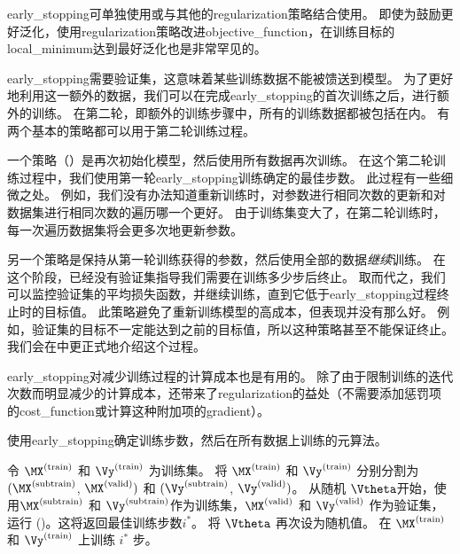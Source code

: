 \gls{early_stopping}可单独使用或与其他的\gls{regularization}策略结合使用。
即使为鼓励更好泛化，使用\gls{regularization}策略改进\gls{objective_function}，在训练目标的\gls{local_minimum}达到最好泛化也是非常罕见的。

\gls{early_stopping}需要验证集，这意味着某些训练数据不能被馈送到模型。
为了更好地利用这一额外的数据，我们可以在完成\gls{early_stopping}的首次训练之后，进行额外的训练。
在第二轮，即额外的训练步骤中，所有的训练数据都被包括在内。
有两个基本的策略都可以用于第二轮训练过程。


一个策略（）是再次初始化模型，然后使用所有数据再次训练。
在这个第二轮训练过程中，我们使用第一轮\gls{early_stopping}训练确定的最佳步数。
此过程有一些细微之处。
例如，我们没有办法知道重新训练时，对参数进行相同次数的更新和对数据集进行相同次数的遍历哪一个更好。
由于训练集变大了，在第二轮训练时，每一次遍历数据集将会更多次地更新参数。

另一个策略是保持从第一轮训练获得的参数，然后使用全部的数据\emph{继续}训练。
在这个阶段，已经没有验证集指导我们需要在训练多少步后终止。
取而代之，我们可以监控验证集的平均损失函数，并继续训练，直到它低于\gls{early_stopping}过程终止时的目标值。
此策略避免了重新训练模型的高成本，但表现并没有那么好。
例如，验证集的目标不一定能达到之前的目标值，所以这种策略甚至不能保证终止。
我们会在中更正式地介绍这个过程。

\gls{early_stopping}对减少训练过程的计算成本也是有用的。
除了由于限制训练的迭代次数而明显减少的计算成本，还带来了\gls{regularization}的益处（不需要添加惩罚项的\gls{cost_function}或计算这种附加项的\gls{gradient}）。

\begin{algorithm}[ht]
\caption{使用\gls{early_stopping}确定训练步数，然后在所有数据上训练的元算法。
}
\label{alg:early_stopping_retrain}
\begin{algorithmic}
\STATE 令 $\MX^{(\text{train})}$ 和 $\Vy^{(\text{train})}$ 为训练集。
\STATE 将 $\MX^{(\text{train})}$ 和 $\Vy^{(\text{train})}$ 分别分割为 $(\MX^{(\text{subtrain})}$, $\MX^{(\text{valid})})$ 和 $(\Vy^{(\text{subtrain})}$, $\Vy^{(\text{valid})})$。
\STATE 从随机 $\Vtheta$开始，使用$\MX^{(\text{subtrain})}$ 和 $\Vy^{(\text{subtrain})}$作为训练集，$\MX^{(\text{valid})}$ 和 $\Vy^{(\text{valid})}$ 作为验证集，运行 ()。这将返回最佳训练步数$i^*$。
\STATE 将 $\Vtheta$ 再次设为随机值。
\STATE 在 $\MX^{(\text{train})}$ 和 $\Vy^{(\text{train})}$ 上训练 $i^*$ 步。  
\end{algorithmic}
\end{algorithm}

